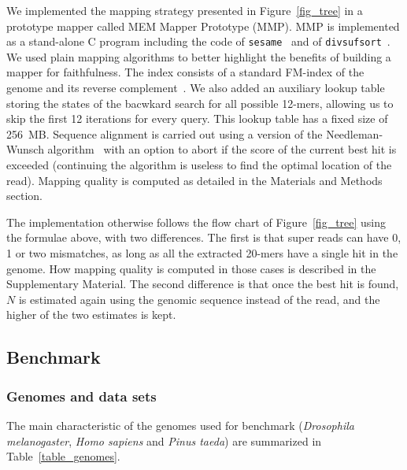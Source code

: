 \documentclass[a4,center,fleqn]{NAR}
\begin{document}
We implemented the mapping strategy presented in Figure~\ref{fig_tree} in
a prototype mapper called MEM Mapper Prototype (MMP). MMP is implemented
as a stand-alone C program including the code of
\texttt{sesame}~\cite{Filion619155} and of
\texttt{divsufsort}~\cite{fischer2017dismantling}. We used plain
mapping algorithms to better highlight the benefits of building a mapper
for faithfulness. The index consists of a standard FM-index of the genome
and its reverse complement~\citep[the implementation is detailed in
ref.][]{blog}. We also added an auxiliary lookup table storing the states
of the bacwkard search for all possible 12-mers, allowing us to skip the
first 12 iterations for every query. This lookup table has a fixed size of
256~MB. Sequence alignment is carried out using a version of the
Needleman-Wunsch algorithm~\cite{pmid5420325} with an option to abort if
the score of the current best hit is exceeded (continuing the algorithm is
useless to find the optimal location of the read). Mapping quality is
computed as detailed in the Materials and Methods section.

The implementation otherwise follows the flow chart of
Figure~\ref{fig_tree} using the formulae above, with two differences.
The first is that super reads can have 0, 1 or two mismatches, as long as
all the extracted 20-mers have a single hit in the genome. How mapping
quality is computed in those cases is described in the Supplementary
Material. The second difference is that once the best hit is found, $N$ is
estimated again using the genomic sequence instead of the read, and the
higher of the two estimates is kept.

\subsection{Benchmark}

\subsubsection{Genomes and data sets}

The main characteristic of the genomes used for benchmark
(\textit{Drosophila melanogaster}, \textit{Homo sapiens} and \textit{Pinus
taeda}) are summarized in Table~\ref{table_genomes}.

\begin{table}[b]
{}
\end{table}
\end{document}
